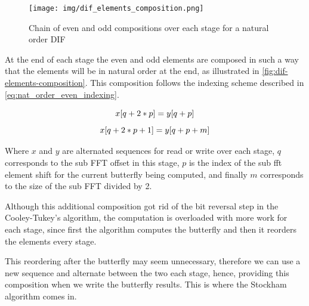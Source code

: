 \documentclass[
  oneside,
  11pt, a4paper,
  footinclude=true,
  headinclude=true,
  cleardoublepage=empty
]{scrbook}
\begin{document}
\begin{figure}[h] 
    \centering
    \texttt{[image: img/dif\_elements\_composition.png]}
    \caption{Chain of even and odd compositions over each stage for a natural order DIF}
    \label{fig:dif-elements-composition}
\end{figure}

At the end of each stage the even and odd elements are composed in such a way that the elements will be in natural order at the end, as illustrated in \autoref{fig:dif-elements-composition}. This composition follows the indexing scheme described in \autoref{eq:nat_order_even_indexing}.

\begin{equation} \label{eq:nat_order_even_indexing}
    x[q + 2*p] = y[q + p] \\
\end{equation}
\begin{equation} \label{eq:nat_order_odd_indexing}
    x[q + 2*p + 1] = y[q + p + m] \\
\end{equation}

Where $x$ and $y$ are alternated sequences for read or write over each stage, $q$ corresponds to the sub FFT offset in this stage, $p$ is the index of the sub \acrshort{fft} element shift for the current butterfly being computed, and finally $m$ corresponds to the size of the sub FFT divided by 2.

Although this additional composition got rid of the bit reversal step in the Cooley-Tukey's algorithm, the computation is overloaded with more work for each stage, since first the algorithm computes the butterfly and then it reorders the elements every stage.

This reordering after the butterfly may seem unnecessary, therefore we can use a new sequence and alternate between the two each stage, hence, providing this composition when we write the butterfly results. This is where the Stockham algorithm comes in.

\end{document}
